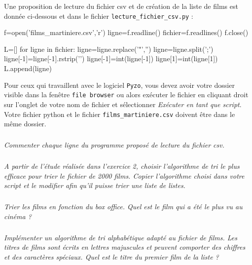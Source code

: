 Une proposition de lecture du fichier csv et de création de la liste de films est donnée ci-dessous et dans le fichier \texttt{lecture\_fichier\_csv.py} :

\begin{python}
f=open('films_martiniere.csv','r')
ligne=f.readline()
fichier=f.readlines()
f.close()

L=[]
for ligne in fichier:
    ligne=ligne.replace('"','')
    ligne=ligne.split(';')
    ligne[-1]=ligne[-1].rstrip('\n')
    ligne[-1]=int(ligne[-1])
    ligne[1]=int(ligne[1])
    L.append(ligne)
\end{python}

Pour ceux qui travaillent avec le logiciel \texttt{Pyzo}, vous devez avoir votre dossier visible dans la fenêtre \texttt{file browser} ou alors exécuter le fichier en cliquant droit sur l'onglet de votre nom de fichier et sélectionner \textit{Exécuter en tant que script}. Votre fichier python et le fichier \texttt{films\_martiniere.csv} doivent être dans le même dossier.

\subparagraph{}
\textit{Commenter chaque ligne du programme proposé de lecture du fichier csv. %
}

\subparagraph{}
\textit{A partir de l'étude réalisée dans l'exercice 2, choisir l'algorithme de tri le plus efficace pour trier le 
fichier de 2000 films. Copier l'algorithme choisi dans votre script et le modifier afin qu'il puisse trier une liste 
de listes.}

\subparagraph{}
\textit{Trier les films en fonction du box office. Quel est le film qui a été le plus vu au cinéma ?}


\subparagraph{}
\textit{Implémenter un algorithme de tri alphabétique adapté au fichier de films. Les titres de films sont écrits en 
lettres majuscules et peuvent comporter des chiffres et des caractères spéciaux. Quel est le titre du premier film de 
la liste ?}



\fi


